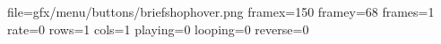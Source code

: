 file=gfx/menu/buttons/briefshophover.png
framex=150
framey=68
frames=1
rate=0
rows=1
cols=1
playing=0
looping=0
reverse=0